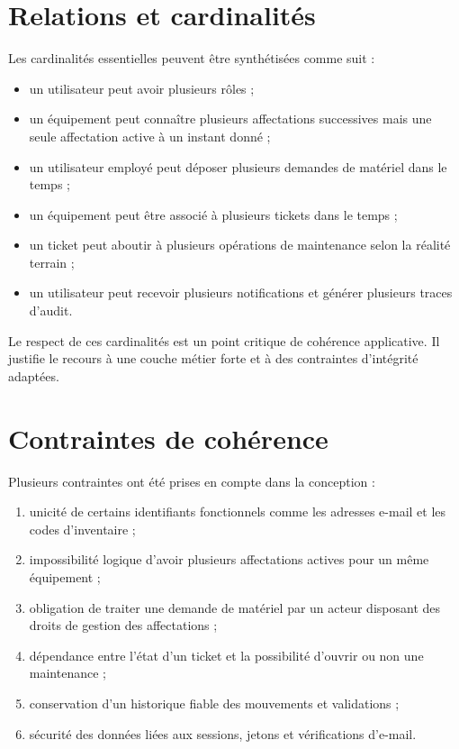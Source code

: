 \section{Relations et cardinalités}
Les cardinalités essentielles peuvent être synthétisées comme suit :
\begin{itemize}
  \item un utilisateur peut avoir plusieurs rôles ;
  \item un équipement peut connaître plusieurs affectations successives mais une seule affectation active à un instant donné ;
  \item un utilisateur employé peut déposer plusieurs demandes de matériel dans le temps ;
  \item un équipement peut être associé à plusieurs tickets dans le temps ;
  \item un ticket peut aboutir à plusieurs opérations de maintenance selon la réalité terrain ;
  \item un utilisateur peut recevoir plusieurs notifications et générer plusieurs traces d'audit.
\end{itemize}

Le respect de ces cardinalités est un point critique de cohérence applicative. Il justifie le recours à une couche métier forte et à des contraintes d'intégrité adaptées.

\section{Contraintes de cohérence}
Plusieurs contraintes ont été prises en compte dans la conception :
\begin{enumerate}
  \item unicité de certains identifiants fonctionnels comme les adresses e-mail et les codes d'inventaire ;
  \item impossibilité logique d'avoir plusieurs affectations actives pour un même équipement ;
  \item obligation de traiter une demande de matériel par un acteur disposant des droits de gestion des affectations ;
  \item dépendance entre l'état d'un ticket et la possibilité d'ouvrir ou non une maintenance ;
  \item conservation d'un historique fiable des mouvements et validations ;
  \item sécurité des données liées aux sessions, jetons et vérifications d'e-mail.
\end{enumerate}


